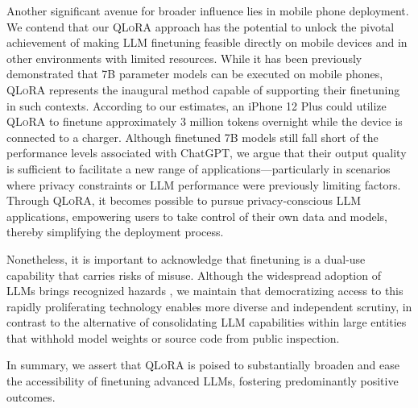 Another significant avenue for broader influence lies in mobile phone deployment. We contend that our \textsc{QLoRA} approach has the potential to unlock the pivotal achievement of making LLM finetuning feasible directly on mobile devices and in other environments with limited resources. While it has been previously demonstrated that 7B parameter models can be executed on mobile phones, \textsc{QLoRA} represents the inaugural method capable of supporting their finetuning in such contexts. According to our estimates, an iPhone 12 Plus could utilize \textsc{QLoRA} to finetune approximately 3 million tokens overnight while the device is connected to a charger. Although finetuned 7B models still fall short of the performance levels associated with ChatGPT, we argue that their output quality is sufficient to facilitate a new range of applications—particularly in scenarios where privacy constraints or LLM performance were previously limiting factors. Through \textsc{QLoRA}, it becomes possible to pursue privacy-conscious LLM applications, empowering users to take control of their own data and models, thereby simplifying the deployment process.

Nonetheless, it is important to acknowledge that finetuning is a dual-use capability that carries risks of misuse. Although the widespread adoption of LLMs brings recognized hazards \citep{bommasani2021opportunities,bender2021dangers}, we maintain that democratizing access to this rapidly proliferating technology enables more diverse and independent scrutiny, in contrast to the alternative of consolidating LLM capabilities within large entities that withhold model weights or source code from public inspection.

In summary, we assert that \textsc{QLoRA} is poised to substantially broaden and ease the accessibility of finetuning advanced LLMs, fostering predominantly positive outcomes.